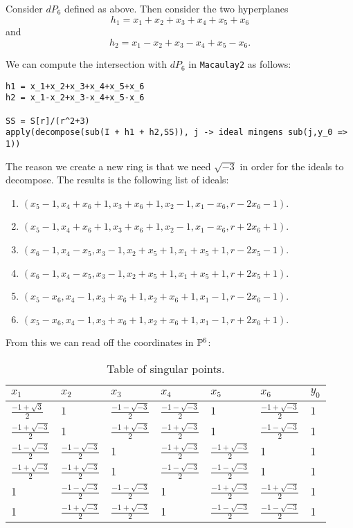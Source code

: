 \documentclass[11pt, english]{article}
\begin{document}
Consider $dP_6$ defined as above. Then consider the two hyperplanes
$$
h_1 = x_1+x_2+x_3+x_4+x_5+x_6
$$
and
$$
h_2 = x_1-x_2+x_3-x_4+x_5-x_6.
$$

We can compute the intersection with $dP_6$ in \texttt{Macaulay2} as follows:
\begin{lstlisting}
h1 = x_1+x_2+x_3+x_4+x_5+x_6
h2 = x_1-x_2+x_3-x_4+x_5-x_6

SS = S[r]/(r^2+3)
apply(decompose(sub(I + h1 + h2,SS)), j -> ideal mingens sub(j,y_0 => 1))
\end{lstlisting}

The reason we create a new ring is that we need $\sqrt{-3}$ in order for the ideals to decompose. The results is the following list of ideals:

\begin{enumerate}
	\item $(x_5-1,x_4+x_6+1,x_3+x_6+1,x_2-1,x_1-x_6,r-2x_6-1)$.
	\item $(x_5-1,x_4+x_6+1,x_3+x_6+1,x_2-1,x_1-x_6,r+2x_6+1)$.
	\item $(x_6-1,x_4-x_5,x_3-1,x_2+x_5+1,x_1+x_5+1,r-2x_5-1)$.
	\item $(x_6-1,x_4-x_5,x_3-1,x_2+x_5+1,x_1+x_5+1,r+2x_5+1)$.
	\item $(x_5-x_6,x_4-1,x_3+x_6+1,x_2+x_6+1,x_1-1,r-2x_6-1)$.
	\item $(x_5-x_6,x_4-1,x_3+x_6+1,x_2+x_6+1,x_1-1,r+2x_6+1)$.
\end{enumerate}


From this we can read off the coordinates in $\mathbb{P}^6$:

\begin{table}[h]
\centering
\caption{Table of singular points.}
\label{singpoints}
\begin{tabular}{@{}lllllll@{}}
\toprule
$x_1$ & $x_2$ & $x_3$ & $x_4$ & $x_5$ & $x_6$ & $y_0$ \\ \midrule
$\frac{-1+\sqrt{3}}{2}$ & $1$ & $\frac{-1-\sqrt{-3}}{2}$ & $\frac{-1-\sqrt{-3}}{2}$ & $1$& $\frac{-1 + \sqrt{-3}}{2}$  & $1$ \\
 $\frac{-1+\sqrt{-3}}{2}$& 1 & $\frac{-1+\sqrt{-3}}{2}$ & $\frac{-1+\sqrt{-3}}{2}$ & 1& $\frac{-1-\sqrt{-3}}{2}$ & 1 \\
 $\frac{-1-\sqrt{-3}}{2}$ & $\frac{-1-\sqrt{-3}}{2}$ & 1  & $\frac{-1+\sqrt{-3}}{2}$  & $\frac{-1+\sqrt{-3}}{2}$ & 1& 1 \\
$ \frac{-1+\sqrt{-3}}{2}$ & $\frac{-1+\sqrt{-3}}{2}$ & 1  & $\frac{-1-\sqrt{-3}}{2}$ & $\frac{-1-\sqrt{-3}}{2}$ & 1& 1 \\
1& $\frac{-1-\sqrt{-3}}{2}$ & $\frac{-1-\sqrt{-3}}{2}$ & 1 & $\frac{-1+\sqrt{-3}}{2}$ & $\frac{-1+\sqrt{-3}}{2}$ & 1 \\
1& $\frac{-1+\sqrt{-3}}{2}$ & $\frac{-1+\sqrt{-3}}{2}$ & 1 & $\frac{-1-\sqrt{-3}}{2}$ & $\frac{-1-\sqrt{-3}}{2}$  & 1 \\ \bottomrule
\end{tabular}
\end{table}
\end{document}
